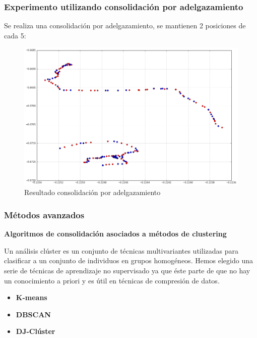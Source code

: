 \documentclass[10pt, spanish]{beamer}
\begin{document}
\begin{frame}[fragile]
\frametitle{Experimento utilizando consolidaci\'on por adelgazamiento}
Se realiza una consolidaci\'on por adelgazamiento, se mantienen 2 posiciones de cada 5:\\

\bigskip

\begin{figure}[H]
	\includegraphics[scale=.25]{thinningSuj1.png}
	\caption{Resultado consolidaci\'on por adelgazamiento}
\end{figure}

\end{frame}



\begin{frame}[fragile]
\frametitle{M\'etodos avanzados}

\textbf{Algoritmos de consolidaci\'on asociados a m\'etodos de clustering}\\

\bigskip

Un an\'alisis cl\'uster es un conjunto de t\'ecnicas multivariantes utilizadas para clasificar a un conjunto de individuos en grupos homog\'eneos. Hemos elegido una serie de t\'ecnicas de aprendizaje no supervisado ya que \'este parte de que no hay un conocimiento a priori y es \'util en t\'ecnicas de compresi\'on de datos.


\begin{itemize}
\item \textbf{K-means}
\item \textbf{DBSCAN}
\item \textbf{DJ-Cl\'uster}
\end{itemize}

\end{frame}
\end{document}
